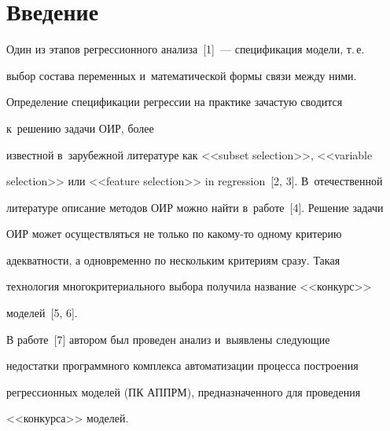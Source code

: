  \thispagestyle{headings}


 







\section{Введение}





  Один из этапов регрессионного анализа~[1]~--- спецификация модели, т.\,е.\ 


выбор состава переменных и~математической формы связи между ними. 


Определение спецификации регрессии на практике зачастую сводится 


к~решению задачи ОИР, более 


известной в~зарубежной литературе как <<subset selection>>, <<variable 


selection>> или <<feature selection>> in regression~[2, 3]. В~отечественной 


литературе описание методов ОИР можно найти в~работе~[4]. Решение задачи 


ОИР может осуществляться не только по ка\-ко\-му-то одному критерию 


адекватности, а одновременно по нескольким критериям сразу. Такая 


технология многокритериального выбора получила название <<конкурс>> 


моделей~[5, 6].


  


  В работе~[7] автором был проведен анализ и~выявлены сле\-ду\-ющие 


недостатки программного комплекса автоматизации процесса построения 


регрессионных моделей (ПК АППРМ), предназначенного для проведения 


<<конкурса>> моделей.


